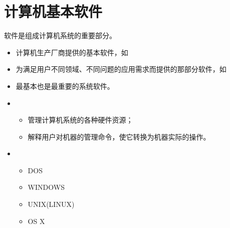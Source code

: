 \section{计算机基本软件}

\begin{frame}\ft{\secname}
软件是组成计算机系统的重要部分。

\begin{itemize}
\item 
{}\quad 计算机生产厂商提供的基本软件，如
\item {}\quad 
为满足用户不同领域、不同问题的应用需求而提供的那部分软件，如
\end{itemize}
\end{frame}

\begin{frame}
\begin{itemize}
\item 最基本也是最重要的系统软件。\\[0.1in]
\item {}\\[0.1in]
\begin{itemize}
	\item 管理计算机系统的各种硬件资源；\\[0.1in]
	\item 解释用户对机器的管理命令，使它转换为机器实际的操作。\\[0.1in]
\end{itemize} 
\item {}\\[0.1in]
\begin{itemize}
	\item DOS \\
	\item WINDOWS \\
	\item UNIX(LINUX) \\
	\item OS X \\
\end{itemize}
\end{itemize}
\end{frame}

